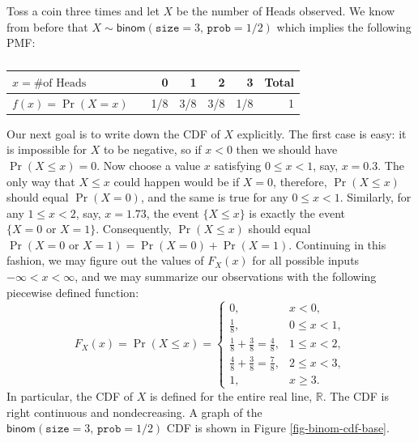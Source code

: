\documentclass[captions=tableheading]{scrbook}
\begin{document}
\begin{example}
Toss a coin three times and let \(X\) be the number of Heads observed. We know from before that \(X\sim\mathsf{binom}(\mathtt{size}=3,\,\mathtt{prob}=1/2)\) which implies the following PMF:
\begin{table}[htb]
\caption{} \label{exa-toss-coin-3-withR}
\begin{center}
\begin{tabular}{llrrrrr}
 \(x=\mbox{\#of Heads}\)  &     &    0  &    1  &    2  &    3  &  Total  \\
\hline
 \(f(x) = \Pr(X = x)\)    &     &  1/8  &  3/8  &  3/8  &  1/8  &      1  \\
\end{tabular}
\end{center}
\end{table}

Our next goal is to write down the CDF of \(X\) explicitly. The first case is easy: it is impossible for \(X\) to be negative, so if \(x<0\) then we should have \(\Pr(X\leq x)=0\). Now choose a value \(x\) satisfying \(0\leq x<1\), say, \(x=0.3\). The only way that \(X\leq x\) could happen would be if \(X=0\), therefore, \(\Pr(X\leq x)\) should equal \(\Pr(X=0)\), and the same is true for any \(0\leq x<1\). Similarly, for any \(1\leq x<2\), say, \(x=1.73\), the event \(\{ X\leq x \}\) is exactly the event \(\{ X=0\mbox{ or }X=1 \}\). Consequently, \(\Pr(X\leq x)\) should equal \(\Pr(X=0\mbox{ or }X=1)=\Pr(X=0)+\Pr(X=1)\). Continuing in this fashion, we may figure out the values of \(F_{X}(x)\) for all possible inputs \(-\infty<x<\infty\), and we may summarize our observations with the following piecewise defined function:
\[
F_{X}(x)=\Pr(X\leq x)=
\begin{cases}
0, & x<0,\\
\frac{1}{8}, & 0\leq x<1,\\
\frac{1}{8}+\frac{3}{8}=\frac{4}{8}, & 1\leq x<2,\\
\frac{4}{8}+\frac{3}{8}=\frac{7}{8}, & 2\leq x<3,\\
1, & x\geq3.
\end{cases}
\]
In particular, the CDF of \(X\) is defined for the entire real line, \(\mathbb{R}\). The CDF is right continuous and nondecreasing. A graph of the \(\mathsf{binom}(\mathtt{size}=3,\,\mathtt{prob}=1/2)\) CDF is shown in Figure \ref{fig-binom-cdf-base}.
\end{example}
\end{document}
